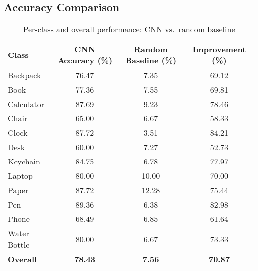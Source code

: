 \documentclass[10pt]{article}
\begin{document}
\subsection{Accuracy Comparison}
\begin{table}[h!]
    \centering
    \caption{Per-class and overall performance: CNN vs.\ random baseline}
    \label{tab:test_summary}
        \begin{tabular}{|l|c|c|c|}
        \hline
        \textbf{Class}       & \textbf{CNN Accuracy (\%)} & \textbf{Random Baseline (\%)} & \textbf{Improvement (\%)} \\ \hline
        Backpack             & 76.47                      & 7.35                           & 69.12                     \\
        Book                 & 77.36                      & 7.55                           & 69.81                     \\
        Calculator           & 87.69                      & 9.23                           & 78.46                     \\
        Chair                & 65.00                      & 6.67                           & 58.33                     \\
        Clock                & 87.72                      & 3.51                           & 84.21                     \\
        Desk                 & 60.00                      & 7.27                           & 52.73                     \\
        Keychain             & 84.75                      & 6.78                           & 77.97                     \\
        Laptop               & 80.00                      & 10.00                          & 70.00                     \\
        Paper                & 87.72                      & 12.28                          & 75.44                     \\
        Pen                  & 89.36                      & 6.38                           & 82.98                     \\
        Phone                & 68.49                      & 6.85                           & 61.64                     \\
        Water Bottle         & 80.00                      & 6.67                           & 73.33                     \\ \hline
        \textbf{Overall}     & \textbf{78.43}             & \textbf{7.56}                  & \textbf{70.87}            \\ \hline
    \end{tabular}
\end{table}
    
\end{document}
